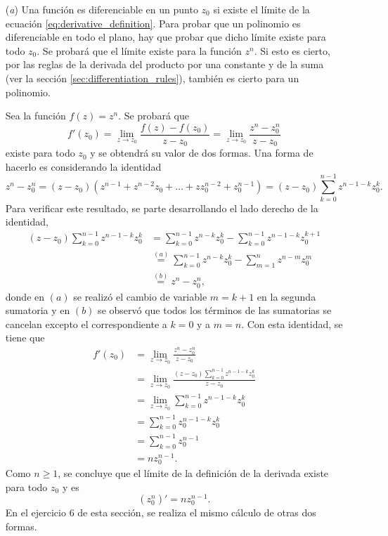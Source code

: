 \documentclass[a4paper]{report}
\begin{document}
\begin{enumerate}
 \item[(\textit{a})] Una función es diferenciable en un punto \(z_0\) si existe el límite de la ecuación \ref{eq:derivative_definition}. Para probar que un polinomio es diferenciable en todo el plano, hay que probar que dicho límite existe para todo \(z_0\). Se probará que el límite existe para la función \(z^n\). Si esto es cierto, por las reglas de la derivada del producto por una constante y de la suma (ver la sección \ref{sec:differentiation_rules}), también es cierto para un polinomio. 
 
 Sea la función \(f(z)=z^n\). Se probará que
 \[
  f'(z_0)=\lim_{z\to z_0}\frac{f(z)-f(z_0)}{z-z_0}=\lim_{z\to z_0}\frac{z^n-z_0^n}{z-z_0}
 \]
 existe para todo \(z_0\) y se obtendrá su valor de dos formas. Una forma de hacerlo es considerando la identidad
 \[
  z^n-z_0^n=(z-z_0)(z^{n-1}+z^{n-2}z_0+\dots+zz_0^{n-2}+z_0^{n-1})=(z-z_0)\sum_{k=0}^{n-1}z^{n-1-k}z_0^k.
 \]
 Para verificar este resultado, se parte desarrollando el lado derecho de la identidad,
 \begin{align*}
  (z-z_0)\sum_{k=0}^{n-1}z^{n-1-k}z_0^k&=\sum_{k=0}^{n-1}z^{n-k}z_0^k-\sum_{k=0}^{n-1}z^{n-1-k}z_0^{k+1}\\
  &\overset{(a)}{=}\sum_{k=0}^{n-1}z^{n-k}z_0^k-\sum_{m=1}^{n}z^{n-m}z_0^{m}\\
  &\overset{(b)}{=}z^n-z_0^n,
 \end{align*}
donde en \((a)\) se realizó el cambio de variable \(m=k+1\) en la segunda sumatoria y en \((b)\) se observó que todos los términos de las sumatorias se cancelan excepto el correspondiente a \(k=0\) y a \(m=n\). Con esta identidad, se tiene que 
\begin{align*}
 f'(z_0)&=\lim_{z\to z_0}\frac{z^n-z_0^n}{z-z_0}\\
  &=\lim_{z\to z_0}\frac{\displaystyle(z-z_0)\sum_{k=0}^{n-1}z^{n-1-k}z_0^k}{z-z_0}\\
  &=\lim_{z\to z_0}\sum_{k=0}^{n-1}z^{n-1-k}z_0^k\\
  &=\sum_{k=0}^{n-1}z_0^{n-1-k}z_0^k\\
  &=\sum_{k=0}^{n-1}z_0^{n-1}\\
  &=nz_0^{n-1}.
\end{align*}
Como \(n\geq1\), se concluye que el límite de la definición de la derivada existe para todo \(z_0\) y es
\[
 (z_0^n)'=nz_0^{n-1}.
\]
En el ejercicio 6 de esta sección, se realiza el mismo cálculo de otras dos formas.


\end{enumerate}
\end{document}
